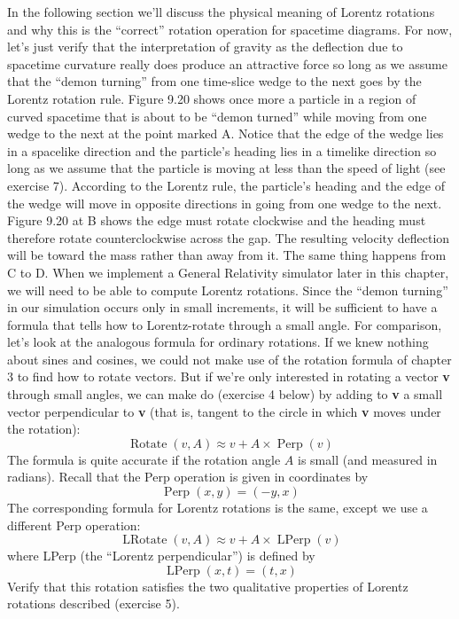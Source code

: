 \documentclass{book}
\begin{document}
In the following section we'll discuss the physical meaning of Lorentz
rotations and why this is the ``correct'' rotation operation for spacetime
diagrams. For now, let's just verify that the interpretation of gravity as
the deflection due to spacetime curvature really does produce an attractive force so long as we assume that the ``demon turning'' from one
time-slice wedge to the next goes by the Lorentz rotation rule. Figure
9.20 shows once more a particle in a region of curved spacetime that
is about to be ``demon turned'' while moving from one wedge to the
next at the point marked A. Notice that the edge of the wedge lies in a
spacelike direction and the particle's heading lies in a timelike direction
so long as we assume that the particle is moving at less than the speed
of light (see exercise 7). According to the Lorentz rule, the particle's
heading and the edge of the wedge will move in opposite directions in
going from one wedge to the next. Figure 9.20 at B shows the edge must
rotate clockwise and the heading must therefore rotate counterclockwise
across the gap. The resulting velocity deflection will be toward the mass
rather than away from it. The same thing happens from C to D.
When we implement a General Relativity simulator later in this chapter, we will need to be able to compute Lorentz rotations. Since the
``demon turning'' in our simulation occurs only in small increments, it
will be sufficient to have a formula that tells how to Lorentz-rotate
through a small angle. For comparison, let's look at the analogous formula for ordinary rotations. If we knew nothing about sines and cosines,
we could not make use of the rotation formula of chapter 3 to find how
to rotate vectors. But if we're only interested in rotating a vector \textbf{v}
through small angles, we can make do (exercise 4 below) by adding to \textbf{v}
a small vector perpendicular to \textbf{v} (that is, tangent to the circle in which
\textbf{v} moves under the rotation):
$$\operatorname{Rotate}(v, A) \approx v + A \times \operatorname{Perp}(v)$$
The formula is quite accurate if the rotation angle $A$ is small (and
measured in radians). Recall that the Perp operation is given in coordinates by
$$\operatorname{Perp}(x, y) = (-y, x)$$
The corresponding formula for Lorentz rotations is the same, except we
use a different Perp operation:
$$\operatorname{LRotate}(v, A) \approx v + A \times \operatorname{LPerp}(v)$$
where LPerp (the ``Lorentz perpendicular'') is defined by
$$\operatorname{LPerp}(x, t) = (t, x)$$
Verify that this rotation satisfies the two qualitative properties of Lorentz
rotations described (exercise 5).
\end{document}
